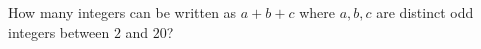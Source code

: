 How many integers can be written as $a+b+c$ where $a,b,c$ are distinct odd integers between $2$ and $20$?
